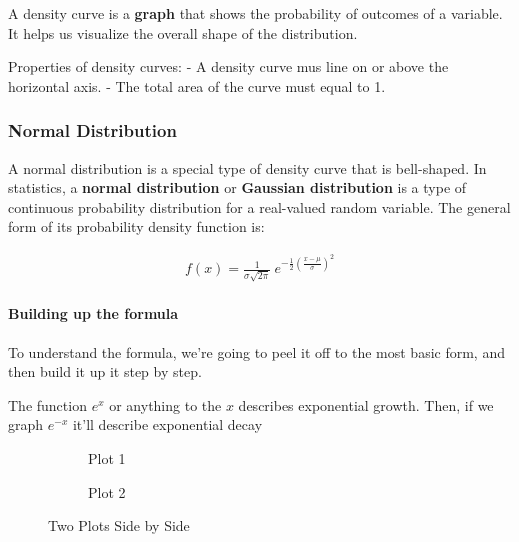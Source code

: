 \documentclass[11pt]{article}
\begin{document}
A density curve is a \textbf{graph} that shows the probability of
outcomes of a variable. It helps us visualize the overall shape of the
distribution.


Properties of density curves: - A density curve mus line on or above the
horizontal axis. - The total area of the curve must equal to 1.

\hypertarget{normal-distribution}{%
\subsubsection{Normal Distribution}\label{normal-distribution}}

A normal distribution is a special type of density curve that is
bell-shaped. In statistics, a \textbf{normal distribution} or
\textbf{Gaussian distribution} is a type of continuous probability
distribution for a real-valued random variable. The general form of its
probability density function is:

\begin{gather}
  f(x) = \frac{1}{\sigma \sqrt{2\pi}}
  \ e^{-\frac{1}{2}(\frac{x - \mu }{\sigma})^2}
\end{gather}


\paragraph{Building up the formula}
To understand the formula, we're going to peel it off to the most basic
form, and then build it up it step by step.

The function \(e^x\) or anything to the \(x\) describes exponential
growth. 
Then, if we graph \(e^{-x}\) it'll describe exponential decay

\begin{figure}
  \centering
  \begin{subfigure}[b]{0.45\textwidth}
    \caption{Plot 1}
    \label{fig:plot1}
  \end{subfigure}
  \hfill
  \begin{subfigure}[b]{0.45\textwidth}
    \caption{Plot 2}
    \label{fig:plot2}
  \end{subfigure}
  \caption{Two Plots Side by Side}
  \label{fig:plots}
\end{figure}
\end{document}
